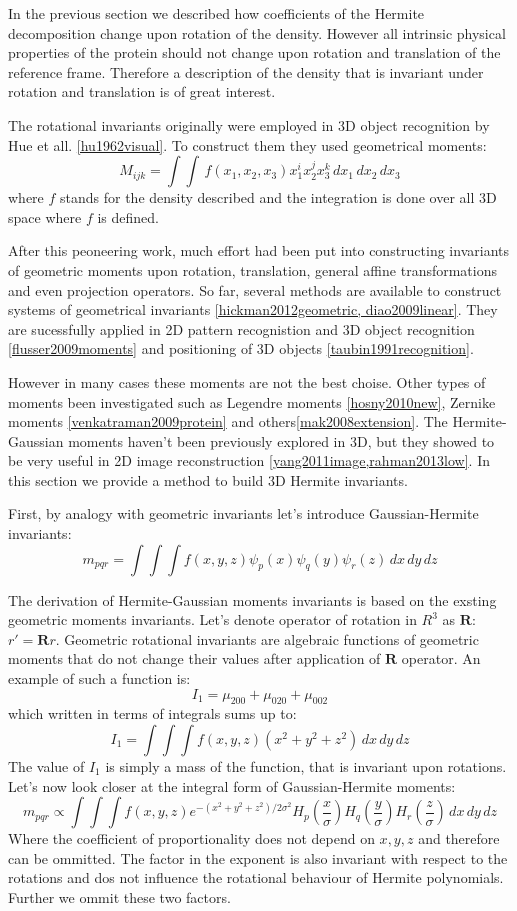 In the previous section we described how coefficients of the Hermite decomposition change upon rotation of the density. However all intrinsic physical properties of the 
protein should not change upon rotation and translation of the reference frame. Therefore a description of the density that is invariant under rotation and translation 
is of great interest.

The rotational invariants originally were employed in 3D object recognition by Hue et all. \ref{hu1962visual}. To construct them they used geometrical moments:
$$M_{ijk}=\int\int\, f(x_{1},x_{2},x_{3})x_{1}^{i}x_{2}^{j}x_{3}^{k}\, dx_{1}\, dx_{2}\, dx_{3}$$
where $f$ stands for the density described and the integration is done over all 3D space where $f$ is defined.

After this peoneering work, much effort had been put into constructing invariants of geometric moments upon rotation, 
translation, general affine transformations and even projection operators. So far, several methods are available to 
construct systems of geometrical invariants \ref{hickman2012geometric, diao2009linear}. They are 
sucessfully applied in 2D pattern recognistion and 3D object recognition \ref{flusser2009moments} and positioning of 3D objects \ref{taubin1991recognition}.

However in many cases these moments are not the best choise. Other types of moments been investigated such as Legendre moments \ref{hosny2010new}, 
Zernike moments \ref{venkatraman2009protein} and others\ref{mak2008extension}. The Hermite-Gaussian moments haven't been previously explored in 3D, but they showed to be very 
useful in 2D image reconstruction \ref{yang2011image,rahman2013low}. In this section we provide a method to build 3D Hermite invariants.

First, by analogy with geometric invariants let's introduce Gaussian-Hermite invariants:
$$m_{pqr}=\int\int\int f(x,y,z)\psi_{p}(x)\psi_{q}(y)\psi_{r}(z)\, dx\, dy\, dz$$

The derivation of Hermite-Gaussian moments invariants is based on the exsting geometric moments invariants. Let's denote operator of rotation in $R^{3}$ as $\mathbf{R}$:
$r'=\mathbf{R}r$.
Geometric rotational invariants are algebraic functions of geometric moments that do not change their values after application of $\mathbf{R}$ operator. 
An example of such a function is:
$$I_{1}=\mu_{200}+\mu_{020}+\mu_{002}$$
which written in terms of integrals sums up to:
$$I_{1}=\int\int\int f(x,y,z)(x^{2}+y^{2}+z^{2})\, dx\, dy\, dz$$
The value of $I_{1}$ is simply a mass of the function, that is invariant upon rotations.
Let's now look closer at the integral form of Gaussian-Hermite moments:
$$m_{pqr}\propto \int\int\int f(x,y,z)e^{-(x^{2}+y^{2}+z^{2})/2\sigma^{2}}H_{p}(\frac{x}{\sigma})H_{q}(\frac{y}{\sigma})H_{r}(\frac{z}{\sigma})\, dx\, dy\, dz$$
Where the coefficient of proportionality does not depend on $x,y,z$ and therefore can be ommitted. The factor in the exponent is also invariant with
respect to the rotations and dos not influence the rotational behaviour of Hermite polynomials. Further we ommit these two factors.

